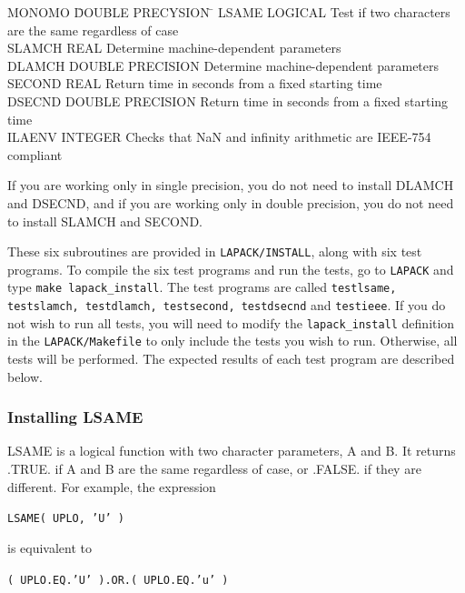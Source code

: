 \documentclass[11pt]{report}
\begin{document}
\begin{tabbing}
MONOMO  \=  DOUBLE PRECYSION  \=  \kill
LSAME   \>  LOGICAL      \> Test if two characters are the same regardless of case \\
SLAMCH  \>  REAL  \> Determine machine-dependent parameters \\
DLAMCH  \>  DOUBLE PRECISION \> Determine machine-dependent parameters \\
SECOND  \>  REAL  \> Return time in seconds from a fixed starting time \\
DSECND  \>  DOUBLE PRECISION  \> Return time in seconds from a fixed starting time\\
ILAENV  \>  INTEGER \> Checks that NaN and infinity arithmetic are IEEE-754 compliant
\end{tabbing}

\noindent
If you are working only in single precision, you do not need to install
DLAMCH and DSECND, and if you are working only in double precision,
you do not need to install SLAMCH and SECOND.

These six subroutines are provided in \texttt{LAPACK/INSTALL},
along with six test programs.
To compile the six test programs and run the tests, go to \texttt{LAPACK} and
type \texttt{make lapack\_install}.  The test programs are called
\texttt{testlsame, testslamch, testdlamch, testsecond, testdsecnd} and
\texttt{testieee}.
If you do not wish to run all tests, you will need to modify the
\texttt{lapack\_install} definition in the \texttt{LAPACK/Makefile} to only include the
tests you wish to run.  Otherwise, all tests will be performed.
The expected results of each test program are described below.

\subsubsection{Installing LSAME}

LSAME is a logical function with two character parameters, A and B.
It returns .TRUE. if A and B are the same regardless of case, or .FALSE.
if they are different.
For example, the expression

\begin{list}{}{}
\item \texttt{LSAME( UPLO, 'U' )}
\end{list}
\noindent
is equivalent to
\begin{list}{}{}
\item \texttt{( UPLO.EQ.'U' ).OR.( UPLO.EQ.'u' )}
\end{list}
\end{document}
